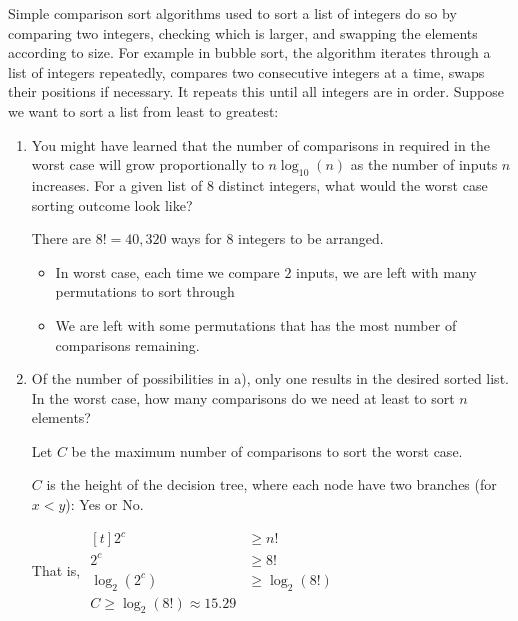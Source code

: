 \begin{example}
    Simple comparison sort algorithms used to sort a list of integers do so by comparing two integers, checking which is larger, and swapping the elements according to size. For example in bubble sort, the algorithm iterates through a list of integers repeatedly, compares two consecutive integers at a time, swaps their positions if necessary. It repeats this until all integers are in order. Suppose we want to sort a list from least to greatest:

    \begin{enumerate}[label=\alph*)]
        \item You might have learned that the number of comparisons in required in the worst case will grow proportionally to $n \log_{10}(n)$ as the number of inputs $n$ increases. For a given list of 8 distinct integers, what would the worst case sorting outcome look like?

        There are $8! = 40,320$ ways for $8$ integers to be arranged. 

        \begin{itemize}
            \item In worst case, each time we compare $2$ inputs, we are left with many permutations to sort through
            \item We are left with some permutations that has the most number of comparisons remaining. 
        \end{itemize}

        \item Of the number of possibilities in a), only one results in the desired sorted list. In the worst case, how many comparisons do we need at least to sort $n$ elements?

        Let $C$ be the maximum number of comparisons to sort the worst case. 

        $C$ is the height of the decision tree, where each node have two branches (for $x < y$): Yes or No. 

        That is, $\begin{aligned}[t]
            2^c          & \ge n!          \\
            2^c          & \ge 8!          \\
            \log_2 (2^c) & \ge \log_2 (8!) \\
            C \ge \log_2 (8!) \approx 15.29
        \end{aligned}$
    \end{enumerate}
\end{example}